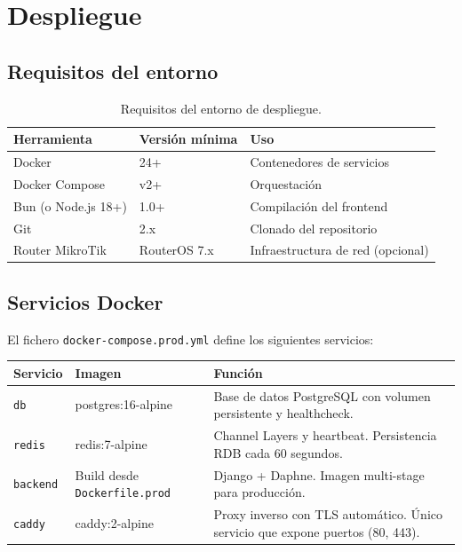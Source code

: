 \documentclass[12pt, a4paper, twoside]{article}
\begin{document}
\section{Despliegue}

\subsection{Requisitos del entorno}

\begin{table}[H]
\centering
\begin{tabularx}{\textwidth}{lll}
  \toprule
  \textbf{Herramienta} & \textbf{Versión mínima} & \textbf{Uso} \\
  \midrule
  Docker & 24+ & Contenedores de servicios \\
  Docker Compose & v2+ & Orquestación \\
  Bun (o Node.js 18+) & 1.0+ & Compilación del frontend \\
  Git & 2.x & Clonado del repositorio \\
  Router MikroTik & RouterOS 7.x & Infraestructura de red (opcional) \\
  \bottomrule
\end{tabularx}
\caption{Requisitos del entorno de despliegue.}
\end{table}

\subsection{Servicios Docker}

El fichero \texttt{docker-compose.prod.yml} define los siguientes servicios:

\begin{longtable}{lp{4cm}p{5cm}}
  \toprule
  \textbf{Servicio} & \textbf{Imagen} & \textbf{Función} \\
  \midrule
  \texttt{db} & postgres:16-alpine & Base de datos PostgreSQL con volumen persistente y healthcheck. \\
  \texttt{redis} & redis:7-alpine & Channel Layers y heartbeat. Persistencia RDB cada 60 segundos. \\
  \texttt{backend} & Build desde \texttt{Dockerfile.prod} & Django + Daphne. Imagen multi-stage para producción. \\
  \texttt{caddy} & caddy:2-alpine & Proxy inverso con TLS automático. Único servicio que expone puertos (80, 443). \\
  \bottomrule
\end{longtable}
\end{document}
